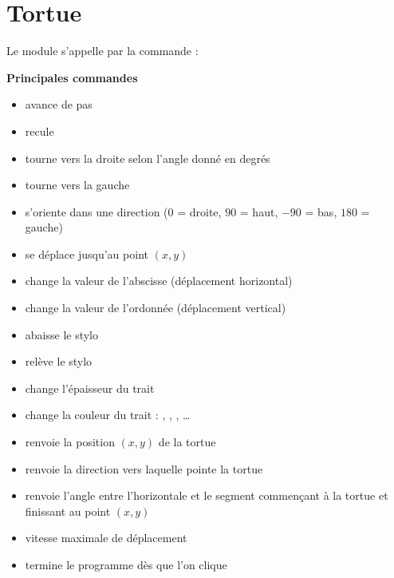 \documentclass[11pt,class=report,crop=false]{standalone}
\begin{document}
\section{Tortue}

Le module  s'appelle par la commande :

\bigskip

\textbf{Principales commandes}
\begin{itemize}
  \item {} \quad avance de  pas
  \item {} \quad recule
  \item {} \quad tourne vers la droite selon l'angle donné en degrés
  \item {} \quad tourne vers la gauche
  \item {} \quad s'oriente dans une direction ($0$ = droite, $90$ = haut, $-90$ = bas, $180$ = gauche)
  \item {} \quad se déplace jusqu'au point $(x,y)$
  \item {} \quad change la valeur de l'abscisse (déplacement horizontal)
  \item {} \quad change la valeur de l'ordonnée (déplacement vertical)
  
  
  \item {} \quad abaisse le stylo
  \item {} \quad relève le stylo
  \item {} \quad change l'épaisseur du trait
  \item {} \quad change la couleur du trait : , , , \ldots
  
  \item {}  \quad renvoie la position $(x,y)$ de la tortue
  \item {} \quad renvoie la direction  vers laquelle pointe la tortue
  \item {} \quad renvoie l'angle entre l'horizontale et le segment commençant à la tortue et finissant au point $(x,y)$
  \item {} \quad vitesse maximale de déplacement
  \item {} \quad termine le programme dès que l'on clique
\end{itemize}
\end{document}
